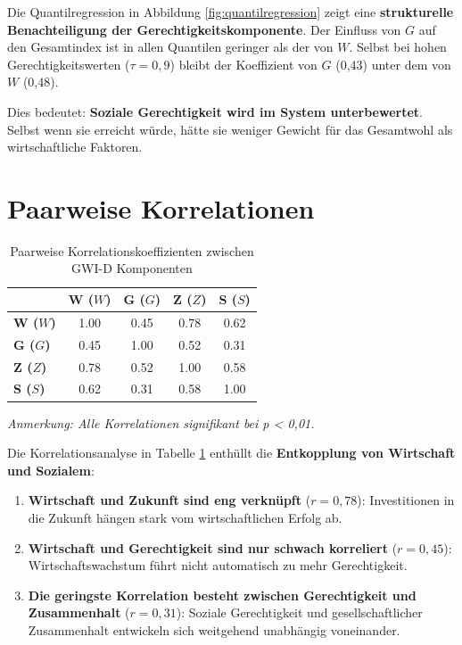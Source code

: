 Die Quantilregression in Abbildung \ref{fig:quantilregression} zeigt eine \textbf{strukturelle Benachteiligung der Gerechtigkeitskomponente}. Der Einfluss von \(G\) auf den Gesamtindex ist in allen Quantilen geringer als der von \(W\). Selbst bei hohen Gerechtigkeitswerten (\(\tau = 0{,}9\)) bleibt der Koeffizient von \(G\) (0,43) unter dem von \(W\) (0,48). 

Dies bedeutet: \textbf{Soziale Gerechtigkeit wird im System unterbewertet}. Selbst wenn sie erreicht würde, hätte sie weniger Gewicht für das Gesamtwohl als wirtschaftliche Faktoren.

\section{Paarweise Korrelationen}

\begin{table}[ht]
  \centering
  \caption{Paarweise Korrelationskoeffizienten zwischen GWI-D Komponenten}
  \label{tab:korrelationen}
  \begin{tabular}{lcccc}
    \toprule
    & \textbf{W (\(W\))} & \textbf{G (\(G\))} & \textbf{Z (\(Z\))} & \textbf{S (\(S\))} \\
    \midrule
    \textbf{W (\(W\))} & 1.00 & 0.45 & 0.78 & 0.62 \\
    \textbf{G (\(G\))} & 0.45 & 1.00 & 0.52 & 0.31 \\
    \textbf{Z (\(Z\))} & 0.78 & 0.52 & 1.00 & 0.58 \\
    \textbf{S (\(S\))} & 0.62 & 0.31 & 0.58 & 1.00 \\
    \bottomrule
  \end{tabular}
\end{table}

\begin{flushleft}
\footnotesize{\textit{Anmerkung: Alle Korrelationen signifikant bei p < 0,01.}}
\end{flushleft}

Die Korrelationsanalyse in Tabelle \ref{tab:korrelationen} enthüllt die \textbf{Entkopplung von Wirtschaft und Sozialem}:

\begin{enumerate}
	\item \textbf{Wirtschaft und Zukunft sind eng verknüpft} (\(r = 0{,}78\)): Investitionen in die Zukunft hängen stark vom wirtschaftlichen Erfolg ab.
	\item \textbf{Wirtschaft und Gerechtigkeit sind nur schwach korreliert} (\(r = 0{,}45\)): Wirtschaftswachstum führt nicht automatisch zu mehr Gerechtigkeit.
	\item \textbf{Die geringste Korrelation besteht zwischen Gerechtigkeit und Zusammenhalt} (\(r = 0{,}31\)): Soziale Gerechtigkeit und gesellschaftlicher Zusammenhalt entwickeln sich weitgehend unabhängig voneinander.
\end{enumerate}

